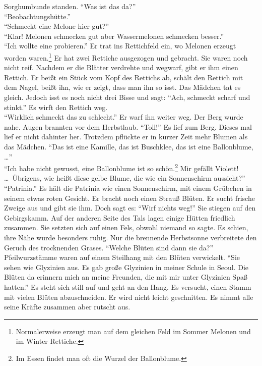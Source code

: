 \documentclass[prd,12pt,tightenlines,notitlepage,nofootinbib]{revtex4-1}
\begin{document}
Sorghumbunde standen.  "`Was ist das da?"'\\
"`Beobachtungshütte."'\\
"`Schmeckt eine Melone hier gut?"'\\
"`Klar!  Melonen schmecken gut aber Wassermelonen schmecken besser."'\\
"`Ich wollte eine probieren."'  Er
trat ins Rettichfeld ein, wo Melonen erzeugt worden waren.\footnote{
Normalerweise erzeugt man auf dem gleichen Feld
im Sommer Melonen und im Winter Rettiche.}
Er hat
zwei Rettiche ausgezogen und gebracht.  Sie waren noch nicht reif.
Nachdem er die Blätter verdrehte und wegwarf, gibt er ihm einen
Rettich.  Er beißt ein Stück vom Kopf des Rettichs ab, schält den
Rettich mit dem Nagel, beißt ihn, wie er zeigt, dass man ihn
so isst.  Das Mädchen tat es gleich.  Jedoch isst es noch nicht drei
Bisse und sagt: "`Ach, schmeckt scharf und stinkt."'  Es wirft den
Rettich weg.
\\ "`Wirklich schmeckt das zu schlecht."'  Er warf ihn weiter
weg.  Der Berg wurde nahe.  Augen brannten vor dem Herbstlaub.
"`Toll!"'  Es lief zum Berg.  Dieses mal lief er nicht dahinter her.
Trotzdem pflückte er in kurzer Zeit mehr Blumen als das Mädchen.
"`Das ist eine Kamille, das ist Buschklee, das ist eine Ballonblume, \ldots"'
\\ "`Ich habe nicht gewusst, eine Ballonblume ist so schön.\footnote{
Im Essen findet man oft die Wurzel der Ballonblume.}
Mir gefällt
Violett!  \ldots\  Übrigens, wie heißt diese gelbe Blume, die wie ein
Sonnenschirm aussieht?"'\\
"`Patrinia."'  Es hält die Patrinia wie einen
Sonnenschirm, mit einem Grübchen in seinem etwas roten Gesicht.  Er
bracht noch einen Strauß Blüten.  Er sucht frische Zweige aus und
gibt sie ihm.  Doch sagt es: "`Wirf nichts weg!"'  Sie stiegen auf den
Gebirgskamm.  Auf der anderen Seite des Tals lagen einige Hütten
friedlich zusammen.  Sie setzten sich auf einen Fels, obwohl niemand
so sagte.  Es schien, ihre Nähe wurde besonders ruhig.  Nur die
brennende Herbstsonne verbreitete den Geruch des trocknenden Grases.
"`Welche Blüten sind dann sie da?"'  Pfeilwurzstämme waren auf einem
Steilhang mit den Blüten verwickelt.  "`Sie sehen wie Glyzinien aus.
Es gab große Glyzinien in meiner Schule in Seoul.  Die Blüten da
erinnern mich an meine Freunden, die mit mir unter Glyzinien Spaß
hatten."'  Es steht sich still auf und geht an den Hang.  Es versucht,
einen Stamm mit vielen Blüten abzuschneiden.  Er wird nicht leicht
geschnitten.  Es nimmt alle seine Kräfte zusammen aber rutscht aus.
\end{document}
